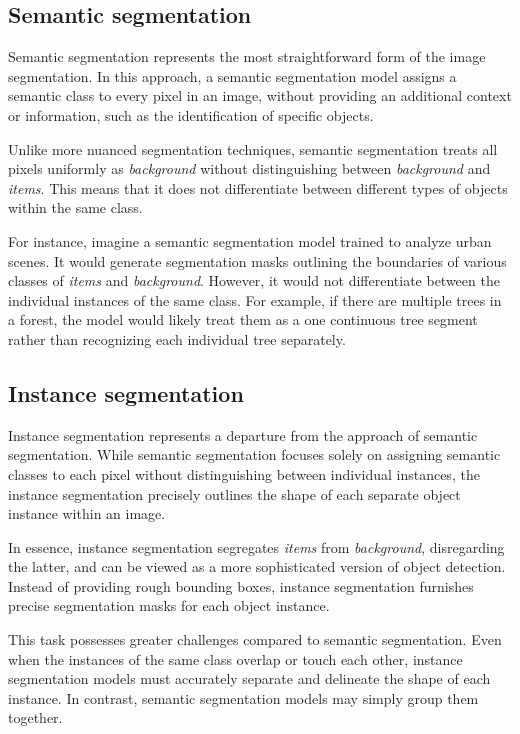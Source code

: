   \subsection{Semantic segmentation}
Semantic segmentation represents the most straightforward form of the image segmentation. In this approach, a semantic segmentation model assigns a semantic class to every pixel in an image, without providing an additional context or information, such as the identification of specific objects.

Unlike more nuanced segmentation techniques, semantic segmentation treats all pixels uniformly as \textit{background} without distinguishing between \textit{background} and \textit{items}. This means that it does not differentiate between different types of objects within the same class.

For instance, imagine a semantic segmentation model trained to analyze urban scenes. It would generate segmentation
masks outlining the boundaries of various classes of \textit{items} and \textit{background}. However, it would not
differentiate between the individual instances of the same class. For example, if there are multiple trees in a
forest, the model would likely treat them as a one continuous tree segment rather than recognizing each individual tree
separately.

\subsection{Instance segmentation}
Instance segmentation represents a departure from the approach of semantic segmentation. While semantic segmentation
focuses solely on assigning semantic classes to each pixel without distinguishing between individual instances,
the instance segmentation precisely outlines the shape of each separate object instance within an image.

In essence, instance segmentation segregates \textit{items} from \textit{background}, disregarding the latter, and can be viewed as a more sophisticated version of object detection. Instead of providing rough bounding boxes, instance segmentation furnishes precise segmentation masks for each object instance.

This task possesses greater challenges compared to semantic segmentation. Even when the instances of the same class
overlap
or touch each other, instance segmentation models must accurately separate and delineate the shape of each instance. In contrast, semantic segmentation models may simply group them together.

